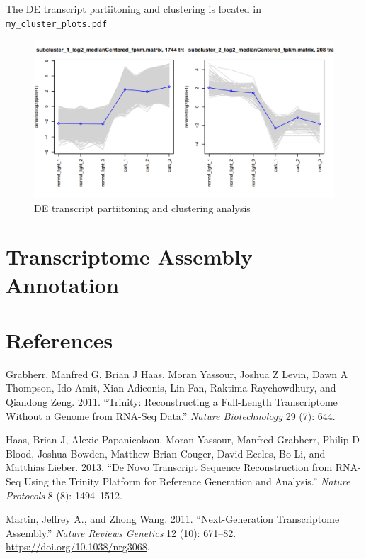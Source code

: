 \documentclass[
  letterpaper,
  DIV=11,
  numbers=noendperiod]{scrreprt}
\newlength{\cslhangindent}
\newlength{\cslentryspacingunit} %
\newenvironment{CSLReferences}[2] %
 {%
  \setlength{\parindent}{0pt}
  \ifodd #1
  \let\oldpar\par
  \def\par{\hangindent=\cslhangindent\oldpar}
  \fi
  \setlength{\parskip}{#2\cslentryspacingunit}
 }%
 {}
\begin{document}
The DE transcript partiitoning and clustering is located in
\texttt{my\_cluster\_plots.pdf}

\begin{figure}

{\centering \includegraphics{assets/37_DE_partition.png}

}

\caption{DE transcript partiitoning and clustering analysis}

\end{figure}


\hypertarget{transcriptome-assembly-annotation}{%
\chapter{Transcriptome Assembly
Annotation}\label{transcriptome-assembly-annotation}}


\hypertarget{references}{%
\chapter*{References}\label{references}}


\hypertarget{refs}{}
\begin{CSLReferences}{1}{0}
\leavevmode{}%
Grabherr, Manfred G, Brian J Haas, Moran Yassour, Joshua Z Levin, Dawn A
Thompson, Ido Amit, Xian Adiconis, Lin Fan, Raktima Raychowdhury, and
Qiandong Zeng. 2011. {``Trinity: Reconstructing a Full-Length
Transcriptome Without a Genome from RNA-Seq Data.''} \emph{Nature
Biotechnology} 29 (7): 644.

\leavevmode{}%
Haas, Brian J, Alexie Papanicolaou, Moran Yassour, Manfred Grabherr,
Philip D Blood, Joshua Bowden, Matthew Brian Couger, David Eccles, Bo
Li, and Matthias Lieber. 2013. {``De Novo Transcript Sequence
Reconstruction from RNA-Seq Using the Trinity Platform for Reference
Generation and Analysis.''} \emph{Nature Protocols} 8 (8): 1494--1512.

\leavevmode{}%
Martin, Jeffrey A., and Zhong Wang. 2011. {``Next-Generation
Transcriptome Assembly.''} \emph{Nature Reviews Genetics} 12 (10):
671--82. \url{https://doi.org/10.1038/nrg3068}.

\end{CSLReferences}
\end{document}
